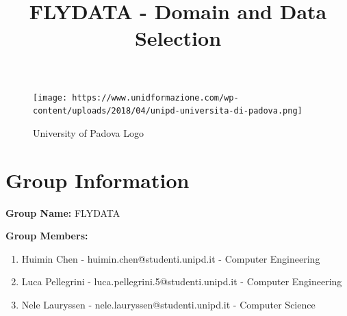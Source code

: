 \documentclass{article}
\begin{document}
\begin{figure}[h!]
    \centering
    \texttt{[image: https://www.unidformazione.com/wp-content/uploads/2018/04/unipd-universita-di-padova.png]}
    \caption{University of Padova Logo}
    \label{fig:unipd-logo}
\end{figure}

\title{FLYDATA - Domain and Data Selection}
\maketitle

\tableofcontents

\section{Group Information}
\textbf{Group Name:} FLYDATA

\textbf{Group Members:}
\begin{enumerate}
    \item Huimin Chen - huimin.chen@studenti.unipd.it - Computer Engineering
    \item Luca Pellegrini - luca.pellegrini.5@studenti.unipd.it - Computer Engineering
    \item Nele Lauryssen - nele.lauryssen@studenti.unipd.it - Computer Science
\end{enumerate}
\end{document}
